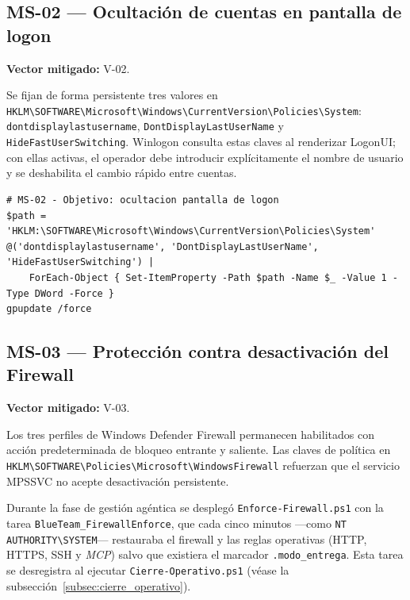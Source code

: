 \subsection{MS-02 --- Ocultación de cuentas en pantalla de logon}

\textbf{Vector mitigado:} V-02.

Se fijan de forma persistente tres valores en \texttt{HKLM\textbackslash}\allowbreak\texttt{SOFTWARE\textbackslash}\allowbreak\texttt{Microsoft\textbackslash}\allowbreak\texttt{Windows\textbackslash}\allowbreak\texttt{CurrentVersion\textbackslash}\allowbreak\texttt{Policies\textbackslash}\allowbreak\texttt{System}: \texttt{dontdisplay}\allowbreak\texttt{lastusername}, \texttt{DontDisplay}\allowbreak\texttt{LastUserName} y \texttt{HideFast}\allowbreak\texttt{UserSwitching}. Winlogon consulta estas claves al renderizar LogonUI; con ellas activas, el operador debe introducir explícitamente el nombre de usuario y se deshabilita el cambio rápido entre cuentas.

\begin{lstlisting}[caption={MS-02 --- Objetivo: ocultar último usuario en LogonUI.}]
# MS-02 - Objetivo: ocultacion pantalla de logon
$path = 'HKLM:\SOFTWARE\Microsoft\Windows\CurrentVersion\Policies\System'
@('dontdisplaylastusername', 'DontDisplayLastUserName', 'HideFastUserSwitching') |
    ForEach-Object { Set-ItemProperty -Path $path -Name $_ -Value 1 -Type DWord -Force }
gpupdate /force
\end{lstlisting}

\subsection{MS-03 --- Protección contra desactivación del Firewall}

\textbf{Vector mitigado:} V-03.

Los tres perfiles de Windows Defender Firewall permanecen habilitados con acción predeterminada de bloqueo entrante y saliente. Las claves de política en \texttt{HKLM\textbackslash}\allowbreak\texttt{SOFTWARE\textbackslash}\allowbreak\texttt{Policies\textbackslash}\allowbreak\texttt{Microsoft\textbackslash}\allowbreak\texttt{WindowsFirewall} refuerzan que el servicio MPSSVC no acepte desactivación persistente.

Durante la fase de gestión agéntica se desplegó \texttt{Enforce-Firewall.ps1} con la tarea \texttt{BlueTeam\_}\allowbreak\texttt{FirewallEnforce}, que cada cinco minutos ---como \texttt{NT AUTHORITY\textbackslash SYSTEM}--- restauraba el firewall y las reglas operativas (HTTP, HTTPS, SSH y \textit{MCP}) salvo que existiera el marcador \texttt{.modo\_}\allowbreak\texttt{entrega}. Esta tarea se desregistra al ejecutar \texttt{Cierre-Operativo.ps1} (véase la subsección~\ref{subsec:cierre_operativo}).

